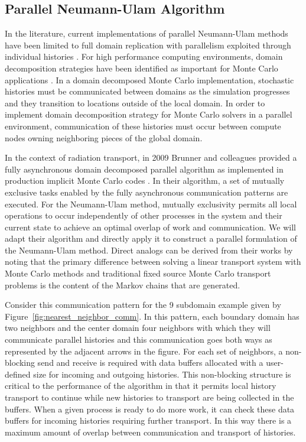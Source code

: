 \documentclass{snamc2013}
\begin{document}
\subsection{Parallel Neumann-Ulam Algorithm}
In the literature, current implementations of parallel Neumann-Ulam
methods have been limited to full domain replication with parallelism
exploited through individual histories
\cite{alexandrov_efficient_1998}. For high performance computing
environments, domain decomposition strategies have been identified as
important for Monte Carlo applications
\cite{brunner_comparison_2006,siegel_analysis_2012}. In a domain
decomposed Monte Carlo implementation, stochastic histories must be
communicated between domains as the simulation progresses and they
transition to locations outside of the local domain. In order to
implement domain decomposition strategy for Monte Carlo solvers in a
parallel environment, communication of these histories must occur
between compute nodes owning neighboring pieces of the global domain.

In the context of radiation transport, in 2009 Brunner and colleagues
provided a fully asynchronous domain decomposed parallel algorithm as
implemented in production implicit Monte Carlo codes
\cite{brunner_efficient_2009}. In their algorithm, a set of mutually
exclusive tasks enabled by the fully asynchronous communication
patterns are executed. For the Neumann-Ulam method, mutually
exclusivity permits all local operations to occur independently of
other processes in the system and their current state to achieve an
optimal overlap of work and communication. We will adapt their
algorithm and directly apply it to construct a parallel formulation of
the Neumann-Ulam method. Direct analogs can be derived from their
works by noting that the primary difference between solving a linear
transport system with Monte Carlo methods and traditional fixed source
Monte Carlo transport problems is the content of the Markov chains
that are generated.

Consider this communication pattern for the 9 subdomain example given
by Figure~\ref{fig:nearest_neighbor_comm}. In this pattern, each
boundary domain has two neighbors and the center domain four neighbors
with which they will communicate parallel histories and this
communication goes both ways as represented by the adjacent arrows in
the figure. For each set of neighbors, a non-blocking send and receive
is required with data buffers allocated with a user-defined size for
incoming and outgoing histories. This non-blocking structure is
critical to the performance of the algorithm in that it permits local
history transport to continue while new histories to transport are
being collected in the buffers. When a given process is ready to do
more work, it can check these data buffers for incoming histories
requiring further transport. In this way there is a maximum amount of
overlap between communication and transport of histories.
\end{document}
